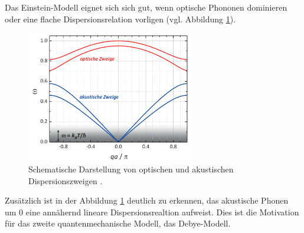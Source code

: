 Das Einstein-Modell eignet sich sich gut, wenn optische Phononen dominieren oder eine
flache Dispersionsrelation vorligen (vgl. Abbildung \ref{fig: dispersions_relation}).
\begin{figure}
  \centering
  \includegraphics[width = 0.65\textwidth]{./content/images/optische_akustische.PNG}
  \caption{Schematische Darstellung von optischen und akustischen Dispersionszweigen \cite[S. 223]{marx}.}
  \label{fig: dispersions_relation}
\end{figure}
Zusätzlich ist in der Abbildung \ref{fig: dispersions_relation} deutlich zu erkennen,
das akustische Phonen um $0$ eine annähernd lineare Dispersionsrealtion aufweist.
Dies ist die Motivation für das zweite quantenmechanische Modell, das
Debye-Modell.

